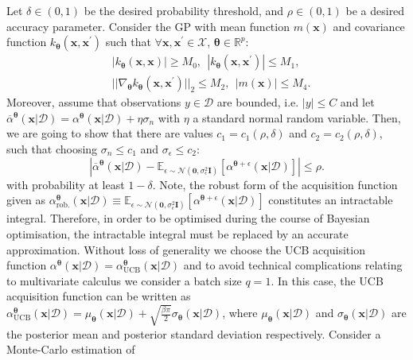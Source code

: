 \documentclass[jair,twoside,11pt,theapa]{article}
\theoremstyle{definition}
\begin{document}
Let $\delta \in (0,1)$ be the desired probability threshold, and $\rho\in(0,1)$ be a desired accuracy parameter. Consider the GP with mean function $m(\bm{x})$ and covariance function $k_{\bm{\theta}}(\bm{x},\bm{x}^{\prime})$ such that $\forall \bm{x},\bm{x}^{\prime}\in\mathcal{X}$, $\bm{\theta}\in\mathbb{R}^{p}$:  
\begin{align}\label{lemma_conditions}
    &|k_{\bm{\theta}}(\bm{x},\bm{x})|\ge M_0,\ \  |k_{\bm{\theta}}(\bm{x},\bm{x}^{\prime})|\le M_1, \\\nonumber
    &||\nabla_{\boldsymbol{\theta}}k_{\bm{\theta}}(\bm{x},\bm{x}^{\prime})||_2\le M_2, \ \ |m(\bm{x})| \le M_4.
\end{align}
Moreover, assume that observations $y\in\mathcal{D}$ are bounded, i.e. $|y|\le C$ and let $\overline{\alpha}^{\bm{\theta}} (\bm{x}|\mathcal{D}) = \alpha^{\bm{\theta}} (\bm{x}|\mathcal{D}) + \eta \sigma_{n}$ with $\eta$ a standard normal random variable. Then, we are going to show that there are values $c_1 = c_1(\rho, \delta)$ and $c_2 = c_2(\rho,\delta)$, such that choosing  $\sigma_{n} \le c_1$ and $\sigma_{\epsilon}\le c_2$: 
\begin{equation*}
    \left|\overline{\alpha}^{\bm{\theta}} (\bm{x}|\mathcal{D}) - \mathbb{E}_{\epsilon \sim \mathcal{N}(\bm{0}, \sigma_{\epsilon}^{2}\bm{I})}\left[\alpha^{\bm{\theta}+\epsilon}(\bm{x}|\mathcal{D})\right]\right| \leq \rho. 
\end{equation*}
with probability at least $1 - \delta$. Note, the robust form of the acquisition function given as $\alpha^{\bm{\theta}}_{\text{rob.}}(\bm{x}|\mathcal{D}) \equiv \mathbb{E}_{\epsilon \sim \mathcal{N}(\bm{0}, \sigma_{\epsilon}^{2}\bm{I})}\left[\alpha^{\bm{\theta}+\epsilon}(\bm{x}|\mathcal{D})\right]$ constitutes an intractable integral. Therefore, in order to be optimised during the course of Bayesian optimisation, the intractable integral must be replaced by an accurate approximation. Without loss of generality we choose the UCB acquisition function  $\alpha^{\bm{\theta}}(\bm{x}|\mathcal{D}) = \alpha_{\text{UCB}}^{\bm{\theta}}(\bm{x}|\mathcal{D})$ and to avoid technical complications relating to multivariate calculus we consider a batch size $q=1$.
In this case, the UCB acquisition function can be written as $\alpha_{\text{UCB}}^{\bm{\theta}}(\bm{x}|\mathcal{D}) = \mu_{\bm{\theta}}(\bm{x}|\mathcal{D}) + \sqrt{\frac{\beta\pi}{2}}\sigma_{\boldsymbol{\theta}}(\bm{x}|\mathcal{D})$, where $\mu_{\bm{\theta}}(\bm{x}|\mathcal{D})$ and $\sigma_{\boldsymbol{\theta}}(\bm{x}|\mathcal{D})$ are the posterior mean and posterior standard deviation respectively. Consider a Monte-Carlo estimation of
\end{document}
